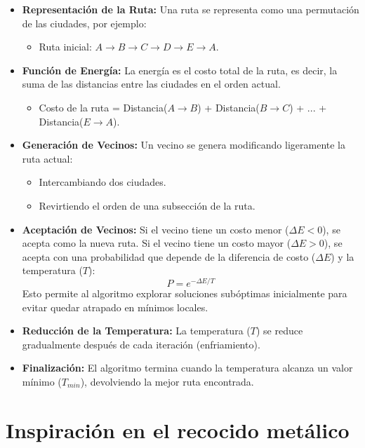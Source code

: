 \documentclass{article}
\begin{document}
\begin{itemize}
    \item \textbf{Representación de la Ruta:} Una ruta se representa como una permutación de las ciudades, por ejemplo:
    \begin{itemize}
        \item Ruta inicial: \(A \rightarrow B \rightarrow C \rightarrow D \rightarrow E \rightarrow A\).
    \end{itemize}
    \item \textbf{Función de Energía:} La energía es el costo total de la ruta, es decir, la suma de las distancias entre las ciudades en el orden actual.
    \begin{itemize}
        \item Costo de la ruta = Distancia(\(A \rightarrow B\)) + Distancia(\(B \rightarrow C\)) + ... + Distancia(\(E \rightarrow A\)).
    \end{itemize}
    \item \textbf{Generación de Vecinos:} Un vecino se genera modificando ligeramente la ruta actual:
    \begin{itemize}
        \item Intercambiando dos ciudades.
        \item Revirtiendo el orden de una subsección de la ruta.
    \end{itemize}
    \item \textbf{Aceptación de Vecinos:} Si el vecino tiene un costo menor (\(\Delta E < 0\)), se acepta como la nueva ruta. Si el vecino tiene un costo mayor (\(\Delta E > 0\)), se acepta con una probabilidad que depende de la diferencia de costo (\(\Delta E\)) y la temperatura (\(T\)):
    \begin{equation}
    P = e^{-\Delta E / T}
    \end{equation}
    Esto permite al algoritmo explorar soluciones subóptimas inicialmente para evitar quedar atrapado en mínimos locales.
    \item \textbf{Reducción de la Temperatura:} La temperatura (\(T\)) se reduce gradualmente después de cada iteración (enfriamiento).
    \item \textbf{Finalización:} El algoritmo termina cuando la temperatura alcanza un valor mínimo (\(T_{min}\)), devolviendo la mejor ruta encontrada.
\end{itemize}

\section{Inspiración en el recocido metálico}
\end{document}
